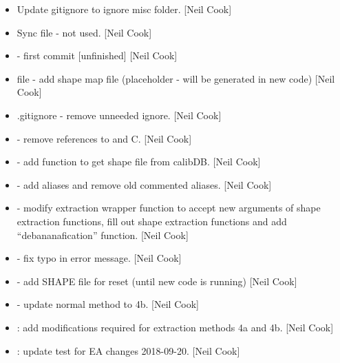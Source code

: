\documentclass[a4paper,10pt,english]{report}
\begin{document}
\begin{itemize}
\item {} 
Update gitignore to ignore misc folder. {[}Neil Cook{]}

\item {} 
Sync file - not used. {[}Neil Cook{]}

\item {} 
 - first commit {[}unfinished{]} {[}Neil Cook{]}

\item {} 
 file - add shape map file (placeholder - will be
generated in new  code) {[}Neil Cook{]}

\item {} 
.gitignore - remove unneeded ignore. {[}Neil Cook{]}

\item {} 
 - remove references to 
and C. {[}Neil Cook{]}

\item {} 
 - add  function to get shape file from
calibDB. {[}Neil Cook{]}

\item {} 
 - add aliases and remove old commented
aliases. {[}Neil Cook{]}

\item {} 
 - modify extraction wrapper function to accept new
arguments of shape extraction functions, fill out shape extraction
functions and add “debananafication” function. {[}Neil Cook{]}

\item {} 
 - fix typo in error message. {[}Neil Cook{]}

\item {} 
 - add SHAPE file for reset (until new 
code is running) {[}Neil Cook{]}

\item {} 
 - update normal method to 4b. {[}Neil Cook{]}

\item {} 
: add modifications required for extraction
methods 4a and 4b. {[}Neil Cook{]}

\item {} 
: update test for EA changes 2018-09-20. {[}Neil
Cook{]}


\end{itemize}
\end{document}

